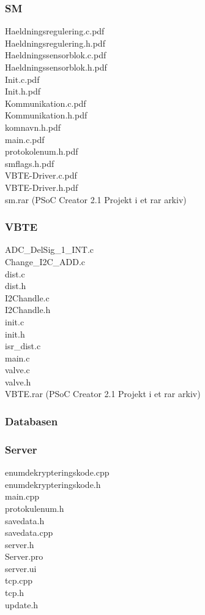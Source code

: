 \subsubsection{SM}
Haeldningsregulering.c.pdf\\
Haeldningsregulering.h.pdf\\
Haeldningssensorblok.c.pdf\\
Haeldningssensorblok.h.pdf\\
Init.c.pdf\\
Init.h.pdf\\
Kommunikation.c.pdf\\
Kommunikation.h.pdf\\
komnavn.h.pdf\\
main.c.pdf\\
protokolenum.h.pdf\\
smflags.h.pdf\\
VBTE-Driver.c.pdf\\
VBTE-Driver.h.pdf\\
sm.rar (PSoC Creator 2.1 Projekt i et rar arkiv)\\
\subsubsection{VBTE}
ADC\_DelSig\_1\_INT.c\\
Change\_I2C\_ADD.c\\
dist.c\\
dist.h\\
I2Chandle.c\\
I2Chandle.h\\
init.c\\
init.h\\
isr\_dist.c\\
main.c\\
valve.c\\
valve.h\\
VBTE.rar (PSoC Creator 2.1 Projekt i et rar arkiv)\\
\subsubsection{Databasen}
\subsubsection*{Server}
enumdekrypteringskode.cpp\\
enumdekrypteringskode.h\\
main.cpp\\
protokulenum.h\\
savedata.h\\
savedata.cpp\\
server.h\\
Server.pro\\
server.ui\\
tcp.cpp\\
tcp.h\\
update.h\\
